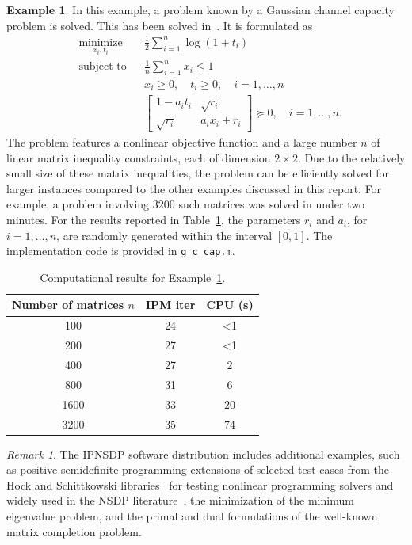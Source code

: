\documentclass[]{interact}
\theoremstyle{plain}%
\theoremstyle{definition}
\newtheorem{example}[theorem]{Example}
\theoremstyle{remark}
\newtheorem{remark}{Remark}
\begin{document}
\begin{example}\label{eg:guass}
In this example, a problem known by a Gaussian channel capacity problem is solved. This has been solved in~\cite{IPMSDP_2012, Yamakawa_2022}. It is formulated as 
\begin{align*}
& \underset{x_i, t_i}{\text{minimize}}
& & \frac{1}{2}\sum_{i=1}^{n}\log(1+t_i) \\
& \text{subject to}
& & \frac{1}{n}\sum_{i=1}^{n}x_i\le 1 \\
& & & x_i\ge 0, \quad t_i\ge 0, \quad i=1,\dots,n \\
& & & \begin{bmatrix}
1-a_it_i & \sqrt{r_i} \\
\sqrt{r_i} & a_ix_i+r_i
\end{bmatrix} \succeq 0, \quad i=1,\dots,n.
\end{align*}
The problem features a nonlinear objective function and a large number \( n \) of linear matrix inequality constraints, each of dimension \( 2 \times 2 \). Due to the relatively small size of these matrix inequalities, the problem can be efficiently solved for larger instances compared to the other examples discussed in this report. For example, a problem involving $3200$ such matrices was solved in under two minutes. For the results reported in Table~\ref{tab:gauss}, the parameters \( r_i \) and \( a_i \), for \( i = 1, \ldots, n \), are randomly generated within the interval \([0,1]\). The implementation code is provided in \texttt{g\_c\_cap.m}.
 
\begin{table}
\centering
\caption{Computational results for Example~\ref{eg:guass}.}
\begin{tabular}{ccc}
\toprule
Number of matrices $n$ & IPM iter & CPU (s) \\
\midrule
100  & 24& <1\\
200   & 27 & <1 \\
400   & 27& 2 \\
800  & 31 & 6 \\
1600  & 33 & 20 \\
3200  & 35 & 74 \\
\bottomrule
\end{tabular}\label{tab:gauss}
\end{table}
\end{example}

\begin{remark}
  The IPNSDP software distribution includes additional examples, such as positive semidefinite programming extensions of selected test cases from the Hock and Schittkowski libraries~\cite{HockSchittkowski1981} for testing nonlinear programming solvers and widely used in the NSDP literature~\cite{penlab, IPMSDP_2012},  the minimization of the minimum eigenvalue problem, and  the primal and dual formulations of the well-known matrix completion problem.
\end{remark}
\end{document}
